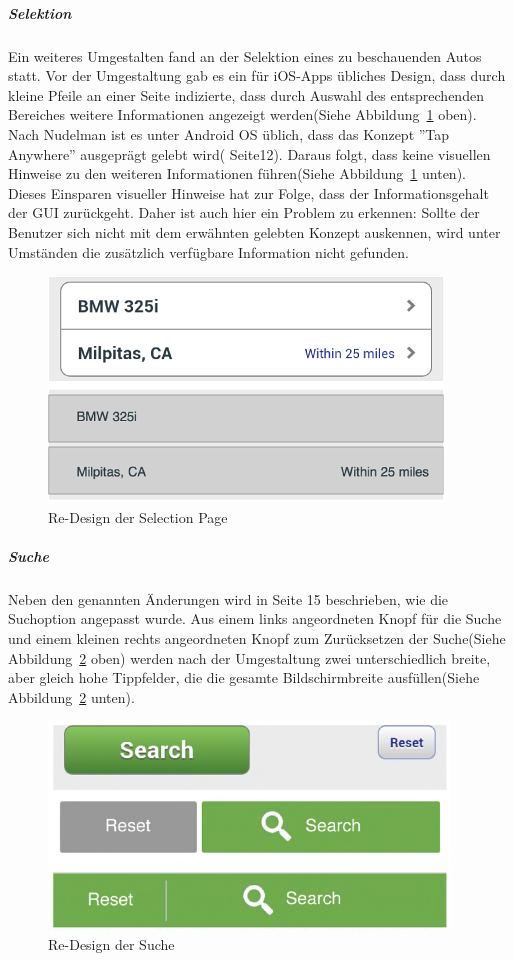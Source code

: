 \subparagraph{Selektion}
\label{sub:selection}
Ein weiteres Umgestalten fand an der Selektion eines zu beschauenden Autos statt. Vor der Umgestaltung gab es ein für iOS-Apps übliches Design, dass durch kleine Pfeile an einer Seite indizierte, dass durch Auswahl des entsprechenden Bereiches weitere Informationen angezeigt werden(Siehe Abbildung~\ref{fig:selection} oben). Nach Nudelman ist es unter Android OS üblich, dass das Konzept ''Tap Anywhere'' ausgeprägt gelebt wird(\cite{AndroidDesignPatterns} Seite12). Daraus folgt, dass keine visuellen Hinweise zu den weiteren Informationen führen(Siehe Abbildung~\ref{fig:selection} unten).\\

Dieses Einsparen visueller Hinweise hat zur Folge, dass der Informationsgehalt der GUI zurückgeht. Daher ist auch hier ein Problem zu erkennen: Sollte der Benutzer sich nicht mit dem erwähnten gelebten Konzept auskennen, wird unter Umständen die zusätzlich verfügbare Information nicht gefunden.\\
\begin{figure}[h]
 \centering
 \includegraphics[height=0.08\textheight]{img/rows.png}
 \caption{Re-Design der Selection Page}
 \label{fig:selection}
\end{figure}

\subparagraph{Suche}
\label{sub:search}
Neben den genannten Änderungen wird in \cite{AndroidDesignPatterns} Seite 15 beschrieben, wie die Suchoption angepasst wurde. Aus einem links angeordneten Knopf für die Suche und einem kleinen rechts angeordneten Knopf zum Zurücksetzen der Suche(Siehe Abbildung~\ref{fig:search} oben) werden nach der Umgestaltung zwei unterschiedlich breite, aber gleich hohe Tippfelder, die die gesamte Bildschirmbreite ausfüllen(Siehe Abbildung~\ref{fig:search} unten).\\

\begin{figure}[!h]
 \centering
 \includegraphics[height=0.08\textheight]{img/search.png}
 \caption{Re-Design der Suche}
 \label{fig:search}
\end{figure}

